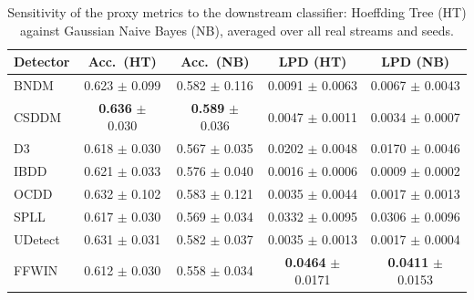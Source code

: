 \begin{table}[!t]
\centering
\caption{Sensitivity of the proxy metrics to the downstream classifier: Hoeffding Tree (HT) against Gaussian Naive Bayes (NB), averaged over all real streams and seeds.}
\label{tab:classifier_sensitivity}
\footnotesize
\setlength{\tabcolsep}{5pt}
\begin{tabular}{@{}lcccc@{}}
\toprule
\textbf{Detector} & \textbf{Acc.\ (HT)} & \textbf{Acc.\ (NB)} & \textbf{LPD (HT)} & \textbf{LPD (NB)} \\
\midrule
BNDM & 0.623 $\pm$ 0.099 & 0.582 $\pm$ 0.116 & 0.0091 $\pm$ 0.0063 & 0.0067 $\pm$ 0.0043 \\
CSDDM & \textbf{0.636} $\pm$ 0.030 & \textbf{0.589} $\pm$ 0.036 & 0.0047 $\pm$ 0.0011 & 0.0034 $\pm$ 0.0007 \\
D3 & 0.618 $\pm$ 0.030 & 0.567 $\pm$ 0.035 & 0.0202 $\pm$ 0.0048 & 0.0170 $\pm$ 0.0046 \\
IBDD & 0.621 $\pm$ 0.033 & 0.576 $\pm$ 0.040 & 0.0016 $\pm$ 0.0006 & 0.0009 $\pm$ 0.0002 \\
OCDD & 0.632 $\pm$ 0.102 & 0.583 $\pm$ 0.121 & 0.0035 $\pm$ 0.0044 & 0.0017 $\pm$ 0.0013 \\
SPLL & 0.617 $\pm$ 0.030 & 0.569 $\pm$ 0.034 & 0.0332 $\pm$ 0.0095 & 0.0306 $\pm$ 0.0096 \\
UDetect & 0.631 $\pm$ 0.031 & 0.582 $\pm$ 0.037 & 0.0035 $\pm$ 0.0013 & 0.0017 $\pm$ 0.0004 \\
FFWIN & 0.612 $\pm$ 0.030 & 0.558 $\pm$ 0.034 & \textbf{0.0464} $\pm$ 0.0171 & \textbf{0.0411} $\pm$ 0.0153 \\
\bottomrule
\end{tabular}
\end{table}
